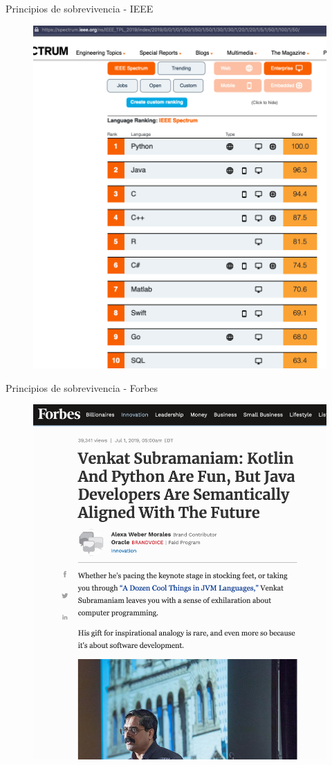 \documentclass[aspectratio=169]{beamer}
\begin{document}
\begin{frame}{Principios de sobrevivencia - IEEE}
    \begin{figure}
        \centering
        \includegraphics[width=0.5\linewidth]{Images/ieeeenterpise}
    \end{figure}
\end{frame}

\begin{frame}{Principios de sobrevivencia - Forbes}
    \begin{figure}
        \centering
        \includegraphics[width=0.5\linewidth]{Images/venkat}
    \end{figure}
\end{frame}
\end{document}
